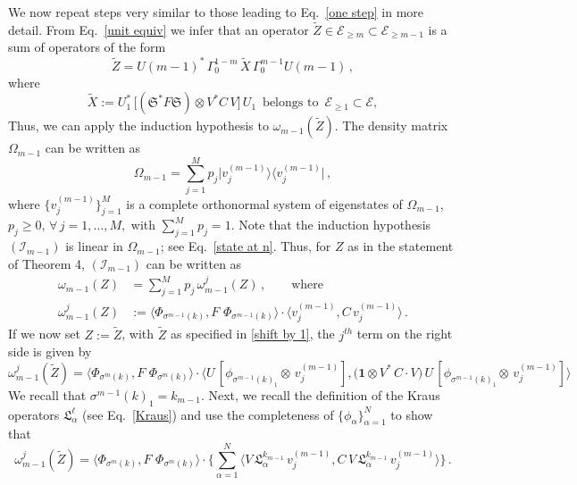 \documentclass[12pt]{article}
\begin{document}
We now repeat steps very similar to those leading to Eq.~\eqref{one step} in more detail.
From Eq.~\eqref{unit equiv} we infer that an operator
$\tilde{Z} \in \mathcal{E}_{\geq m}\subset \mathcal{E}_{\geq m-1}$ is a sum of operators of the form
\begin{equation}\label{shift by 1}
\tilde{Z} = U(m-1)^{*} \,\Gamma_{0}^{1-m}\, \tilde{X}\,\Gamma_{0}^{m-1} U(m-1)\,,
\end{equation}
where
$$\tilde{X}:= U_{1}^{*}\, \big[(\mathfrak{S}^{*}F\mathfrak{S})\otimes V^{*}C\,V\big]\,U_1 \,\text{ belongs to }\, \mathcal{E}_{\geq 1}\subset \mathcal{E},$$
Thus, we can apply the induction hypothesis to $\omega_{m-1}(\tilde{Z})$.
The density matrix $\Omega_{m-1}$ can be written as
\begin{equation}\label{matrix}
\Omega_{m-1}= \sum_{j=1}^{M} p_j \vert v_j^{(m-1)}\rangle \langle v_j^{(m-1)} \vert\,,
\end{equation}
where $\big\{ v_{j}^{(m-1)} \big\}_{j=1}^{M}$ is a complete orthonormal system of eigenstates of $\Omega_{m-1}$, $p_j \geq 0,\,\forall \,j=1,\dots, M,$ with \mbox{$\sum_{j=1}^{M}p_j =1$.}
Note that the induction hypothesis $(\mathcal{I}_{m-1})$ is linear in $\Omega_{m-1}$; see Eq.~\eqref{state at n}. Thus, for $Z$ as in the statement of Theorem 4, $(\mathcal{I}_{m-1})$ can be written as
\begin{align}\label{expand}
\omega_{m-1}(Z)&=\sum_{j=1}^{M} p_j \,\omega_{m-1}^{j}(Z)\,, \qquad \text{where} \nonumber \\
 \omega_{m-1}^{j}(Z)&:= \langle \Phi_{\sigma^{m-1}({k})}, F\,\, \Phi_{\sigma^{m-1}({k})} \rangle \cdot \langle v_{j}^{(m-1)}, C\,v_{j}^{(m-1)}\rangle\,.
\end{align}
If we now set $Z:=\tilde{Z}$, with $\tilde{Z}$ as specified in \eqref{shift by 1}, the $j^{th}$ term on the right side is given by
\begin{equation}\label{jth term}
\omega_{m-1}^{j}(\tilde{Z})=\langle \Phi_{\sigma^{m}({k})}, F\,\, \Phi_{\sigma^{m}({k})} \rangle \cdot
\langle U\,[ \phi_{\sigma^{m-1}({k})_{1}}\otimes \,v_{j}^{(m-1)} ], \big(\mathbf{1}\otimes
V^{*}\,C\cdot V \big)\,U\,[\phi_{\sigma^{m-1}({k})_{1}}\otimes \,v_{j}^{(m-1)} ]\rangle
\end{equation}
We recall that $\sigma^{m-1}({k})_1 = k_{m-1}$. Next, we recall the definition of the Kraus operators
$\mathfrak{L}_{\alpha}^{\ell}$ (see Eq.~\eqref{Kraus}) and use the completeness of
$\big\{\phi_{\alpha}\big\}_{\alpha=1}^{N}$ to show that
$$\omega_{m-1}^{j}(\tilde{Z})= \langle \Phi_{\sigma^{m}({k})}, F\,\,
\Phi_{\sigma^{m}({k})} \rangle \cdot \Big\{ \sum_{\alpha=1}^{N} \langle V\,\mathfrak{L}_{\alpha}^{{k}_{m-1}}\,
v_{j}^{(m-1)}, C\,V\,\mathfrak{L}_{\alpha}^{{k}_{m-1}}\, v_{j}^{(m-1)}\rangle\Big\}\,.$$
\end{document}
